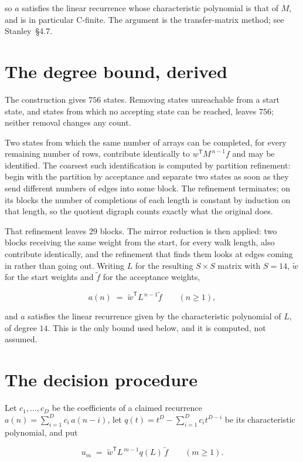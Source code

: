 \documentclass[11pt]{article}
\theoremstyle{definition}
\begin{document}
so $a$ satisfies the linear recurrence whose characteristic polynomial is that of $M$, and is in particular C-finite. The argument is the transfer-matrix method; see Stanley~\S4.7.

\section{The degree bound, derived}

The construction gives $756$ states. Removing states unreachable from a start state, and states from which no accepting state can be reached, leaves $756$; neither removal changes any count.

Two states from which the same number of arrays can be completed, for every remaining number of rows, contribute identically to $w^{\mathsf T}M^{\,n-1}f$ and may be identified. The coarsest such identification is computed by partition refinement: begin with the partition by acceptance and separate two states as soon as they send different numbers of edges into some block. The refinement terminates; on its blocks the number of completions of each length is constant by induction on that length, so the quotient digraph counts exactly what the original does.

That refinement leaves $29$ blocks. The mirror reduction is then applied: two blocks receiving the same weight from the start, for every walk length, also contribute identically, and the refinement that finds them looks at edges coming in rather than going out. Writing $L$ for the resulting $S \times S$ matrix with $S = 14$, $\tilde w$ for the start weights and $\tilde f$ for the acceptance weights,

\[a(n) \;=\; \tilde w^{\mathsf T} L^{\,n-1} \tilde f \qquad (n \ge 1),\]

and $a$ satisfies the linear recurrence given by the characteristic polynomial of $L$, of degree $14$. This is the only bound used below, and it is computed, not assumed.

\section{The decision procedure}

Let $c_1,\dots,c_D$ be the coefficients of a claimed recurrence $a(n) = \sum_{i=1}^{D} c_i\,a(n-i)$, let $q(t) = t^{D} - \sum_{i=1}^{D} c_i t^{D-i}$ be its characteristic polynomial, and put

\[u_m \;=\; \tilde w^{\mathsf T} L^{\,m-1} q(L)\,\tilde f \qquad (m \ge 1).\]
\end{document}
